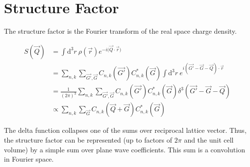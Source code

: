 \documentclass[notitlepage,letter,preprint,prb]{revtex4}
\begin{document}
\section{Structure Factor}
	The structure factor is the Fourier transform of the real space charge density.  
	
	\begin{align}
	S(\vec{Q}) &= \int \mathrm{d}^{3}r\ \rho(\vec{r}) e^{-i(\vec{Q}\cdot{\vec{r})}} \nonumber \\
	&=
	\sum_{n,k}\sum_{\vec{G'},\vec{G}}C_{n,k}(\vec{G'})C^{*}_{n,k}(\vec{G})\int \mathrm{d}^{3}r\ e^{i(\vec{G'}-\vec{G}-\vec{Q})\cdot\vec{r}} \nonumber\\
	&= \frac{1}{{(2\pi)^3}}\sum_{n,k}\sum_{\vec{G'},\vec{G}}C_{n,k}(\vec{G'})C^{*}_{n,k}(\vec{G}) \delta^{3}(\vec{G'}-\vec{G}-\vec{Q}) \nonumber\\
	&\propto\sum_{n,k}\sum_{\vec{G}}C_{n,k}(\vec{Q}+\vec{G})C^{*}_{n,k}(\vec{G})
	\end{align}
	
	The delta function collapses one of the sums over reciprocal lattice vector.  Thus, the structure factor can be represented (up to factors of $2\pi$ and the unit cell volume) by a simple sum over plane wave coefficients.  This sum is a convolution in Fourier space.  
	
	
\end{document}
